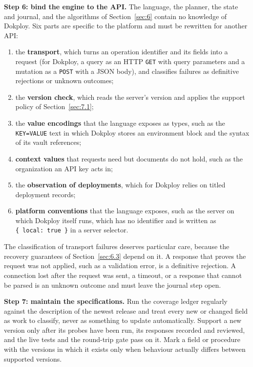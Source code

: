 \textbf{Step 6: bind the engine to the API.} The language, the planner, the state and journal, and the
algorithms of Section~\ref{sec:6} contain no knowledge of Dokploy. Six parts are specific to the platform and
must be rewritten for another API:

\begin{enumerate}
\def\labelenumi{\arabic{enumi}.}
\item
  the \textbf{transport}, which turns an operation identifier and its fields into a request (for Dokploy,
  a query as an HTTP \texttt{GET} with query parameters and a mutation as a \texttt{POST} with a JSON body), and
  classifies failures as definitive rejections or unknown outcomes;
\item
  the \textbf{version check}, which reads the server's version and applies the support policy of
  Section~\ref{sec:7.1};
\item
  the \textbf{value encodings} that the language exposes as types, such as the \texttt{KEY=VALUE} text in which
  Dokploy stores an environment block and the syntax of its vault references;
\item
  \textbf{context values} that requests need but documents do not hold, such as the organization an API
  key acts in;
\item
  the \textbf{observation of deployments}, which for Dokploy relies on titled deployment records;
\item
  \textbf{platform conventions} that the language exposes, such as the server on which Dokploy itself
  runs, which has no identifier and is written as \texttt{\{\ local:\ true\ \}} in a server selector.
\end{enumerate}

The classification of transport failures deserves particular care, because the recovery guarantees of
Section~\ref{sec:6.3} depend on it. A response that proves the request was not applied, such as a validation
error, is a definitive rejection. A connection lost after the request was sent, a timeout, or a
response that cannot be parsed is an unknown outcome and must leave the journal step open.

\textbf{Step 7: maintain the specifications.} Run the coverage ledger regularly against the description of
the newest release and treat every new or changed field as work to classify, never as something to
update automatically. Support a new version only after its probes have been run, its responses
recorded and reviewed, and the live tests and the round-trip gate pass on it. Mark a field or
procedure with the versions in which it exists only when behaviour actually differs between supported
versions.

